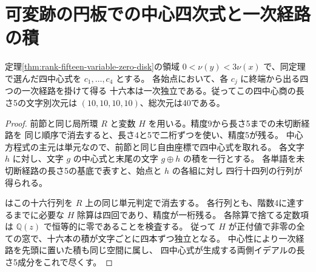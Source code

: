 \section{可変跡の円板での中心四次式と一次経路の積}
\label{sec:rank-fifteen-first-center-products}
\begin{proposition}
定理\ref{thm:rank-fifteen-variable-zero-disk}の領域
$0<\nu(y)<3\nu(x)$ で、同定理で選んだ四中心式を $c_1,\ldots,c_4$ とする。
各始点において、各 $c_j$ に終端から出る四つの一次経路を掛けて得る
十六本は一次独立である。従ってこの四中心商の長さ5の文字別次元は
$(10,10,10,10)$、総次元は40である。
\end{proposition}
\begin{proof}
前節と同じ局所環 $R$ と変数 $H$ を用いる。精度9から長さ5までの未切断経路を
同じ順序で消去すると、長さ4と5で二桁ずつを使い、精度5が残る。
中心方程式の主元は単元なので、前節と同じ自由座標で四中心式を取れる。
各文字 $h$ に対し、文字 $g$ の中心式と末尾の文字 $g\oplus h$ の積を一行とする。
各単語を未切断経路の長さ5の基底で表すと、始点と $h$ の各組に対し
四行十四列の行列が得られる。

はこの十六行列を $R$ 上の同じ単元判定で消去する。
各行列とも、階数4に達するまでに必要な $H$ 除算は四回であり、精度が一桁残る。
各除算で捨てる定数項は $\mathbb Q(z)$ で恒等的に零であることを検査する。
従って $H$ が正付値で非零の全ての窓で、十六本の積が文字ごとに四本ずつ独立となる。
中心性により一次経路を先頭に置いた積も同じ空間に属し、
四中心式が生成する両側イデアルの長さ5成分をこれで尽くす。
\end{proof}
